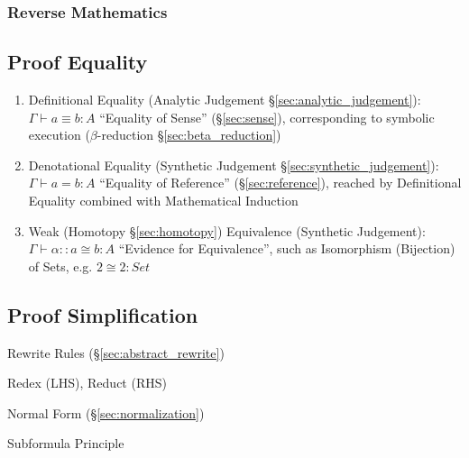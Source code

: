 \subsubsection{Reverse Mathematics}\label{sec:reverse_mathematics}



\subsection{Proof Equality}\label{sec:proof_equality}
\cite{harper12}

\begin{enumerate}
  \item Definitional Equality (Analytic Judgement
    \S\ref{sec:analytic_judgement}): $\Gamma \vdash a \equiv b : A$
    ``Equality of Sense'' (\S\ref{sec:sense}), corresponding to
    symbolic execution ($\beta$-reduction \S\ref{sec:beta_reduction})
  \item Denotational Equality (Synthetic Judgement
    \S\ref{sec:synthetic_judgement}): $\Gamma \vdash a = b : A$
    ``Equality of Reference'' (\S\ref{sec:reference}), reached by
    Definitional Equality combined with Mathematical Induction
  \item Weak (Homotopy \S\ref{sec:homotopy}) Equivalence (Synthetic
    Judgement): $\Gamma \vdash \alpha :: a \cong b : A$ ``Evidence for
    Equivalence'', such as Isomorphism (Bijection) of Sets, e.g. $2
    \cong 2 : Set$
\end{enumerate}



\subsection{Proof Simplification}\label{sec:proof_simplification}

Rewrite Rules (\S\ref{sec:abstract_rewrite})

Redex (LHS), Reduct (RHS)

Normal Form (\S\ref{sec:normalization})

Subformula Principle



